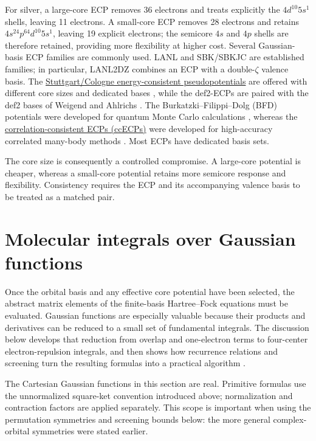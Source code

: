 \documentclass[11pt,a4paper,titlepage]{article}
\numberwithin{equation}{section}
\begin{document}
For silver, a large-core ECP removes 36 electrons and treats explicitly the
$4d^{10}5s^1$ shells, leaving 11 electrons. A small-core ECP removes 28
electrons and retains $4s^24p^64d^{10}5s^1$, leaving 19 explicit electrons;
the semicore $4s$ and $4p$ shells are therefore retained, providing more
flexibility at higher cost. Several Gaussian-basis ECP families are commonly
used. LANL \citep{WadtHay1985} and SBK/SBKJC \citep{Stevens1992} are established families; in particular, LANL2DZ
combines an ECP with a double-$\zeta$ valence basis. The
\href{https://www.tc.uni-koeln.de/PP/clickpse.en.html}
{Stuttgart/Cologne energy-consistent pseudopotentials} are offered with
different core sizes and dedicated bases \citep{Bergner1993}, while the def2-ECPs are paired with
the def2 bases of Weigend and Ahlrichs \citep{WeigendAhlrichs2005}. The Burkatzki--Filippi--Dolg (BFD)
potentials were developed for quantum Monte Carlo calculations \citep{Burkatzki2007}, whereas the
\href{https://pseudopotentiallibrary.org}{correlation-consistent ECPs
(ccECPs)} were developed for high-accuracy correlated many-body methods \citep{Bennett2017}.
Most ECPs have dedicated basis sets.

The core size is consequently a controlled compromise. A large-core potential
is cheaper, whereas a small-core potential retains more semicore response and
flexibility. Consistency requires the ECP and its accompanying valence basis
to be treated as a matched pair.

\section{Molecular integrals over Gaussian functions}
\label{sec:gaussian-integrals}

Once the orbital basis and any effective core potential have been selected,
the abstract matrix elements of the finite-basis Hartree--Fock equations must
be evaluated. Gaussian functions are especially valuable because their
products and derivatives can be reduced to a small set of fundamental
integrals. The discussion below develops that reduction from overlap and
one-electron terms to four-center electron-repulsion integrals, and then shows
how recurrence relations and screening turn the resulting formulas into a
practical algorithm \citep{Gill1994}.

The Cartesian Gaussian functions in this section are real. Primitive
formulas use the unnormalized square-ket convention introduced above;
normalization and contraction factors are applied separately. This scope is
important when using the permutation symmetries and screening bounds below:
the more general complex-orbital symmetries were stated earlier.
\end{document}
